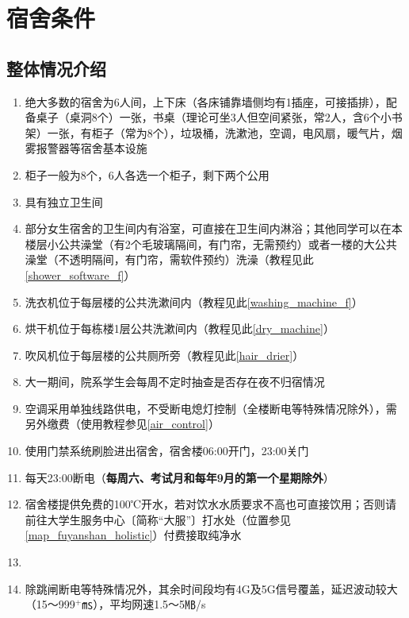 \section[宿舍条件]{宿舍条件}

\subsection[整体情况介绍]{整体情况介绍}
\begin{enumerate}
    \item 绝大多数的宿舍为6人间，上下床\footnotemark（各床铺靠墙侧均有1插座，可接插排），配备桌子（桌洞8个）一张，书桌（理论可坐3人但空间紧张，常2人，含6个小书架）一张，有柜子（常为8个），垃圾桶，洗漱池，空调，电风扇，暖气片，烟雾报警器等宿舍基本设施
    \item 柜子\footnotemark 一般为8个，6人各选一个柜子，剩下两个公用
    \item 具有独立卫生间
    \item 部分女生宿舍的卫生间内有浴室，可直接在卫生间内淋浴；其他同学可以在本楼层小公共澡堂（有2个毛玻璃隔间，有门帘，无需预约）或者一楼的大公共澡堂（不透明隔间，有门帘，需软件预约）洗澡（教程见此\uline{\ref{shower_software_f}}）
    \item 洗衣机位于每层楼的公共洗漱间内（教程见此\uline{\ref{washing_machine_f}}）
    \item 烘干机位于每栋楼1层公共洗漱间内（教程见此\uline{\ref{dry_machine}}）
    \item 吹风机位于每层楼的公共厕所旁（教程见此\uline{\ref{hair_drier}}）
    \item 大一期间，院系学生会每周不定时抽查是否存在夜不归宿情况
    \item 空调采用单独线路供电，不受断电熄灯控制（全楼断电等特殊情况除外），需另外缴费（使用教程参见\uline{\ref{air_control}}）
    \item 使用门禁系统刷脸进出宿舍，宿舍楼06:00开门，23:00关门
    \item 每天23:00断电（\textbf{每周六、考试月和每年9月的第一个星期除外}）
    \item 宿舍楼提供免费的100℃开水\footnotemark，若对饮水水质要求不高也可直接饮用；否则请前往大学生服务中心〔简称“大服”〕打水处（位置参见\uline{\ref{map_fuyanshan_holistic}}）付费接取纯净水
    \item \textbf{}
    \item 除跳闸断电等特殊情况外，其余时间段均有4G及5G信号覆盖，延迟波动较大（15～999$^+$㎳），平均网速1.5～5㎆/s
\end{enumerate}

